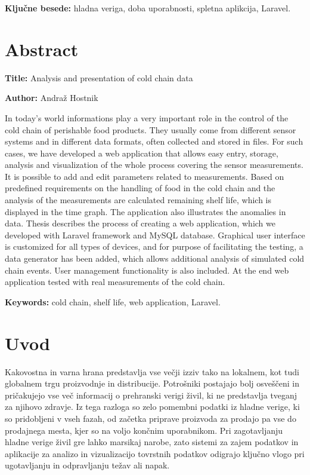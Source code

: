 \documentclass[a4paper, 12pt]{book}
\newcommand{\ttitleEn}{Analysis and presentation of cold chain data}
\newcommand{\tauthor}{Andraž Hostnik}
\newcommand{\tkeywords}{hladna veriga, doba uporabnosti, spletna aplikcija, Laravel}
\newcommand{\tkeywordsEn}{cold chain, shelf life, web application, Laravel}
\newcommand{\clearemptydoublepage}{\newpage{\pagestyle{empty}\cleardoublepage}}
\begin{document}
\noindent\textbf{Ključne besede:} \tkeywords.
\clearemptydoublepage

\chapter*{Abstract}

\noindent\textbf{Title:} \ttitleEn
\bigskip

\noindent\textbf{Author:} \tauthor
\bigskip

\noindent
In today's world informations play a very important role in the control of the cold chain of perishable food products. They usually come from different sensor systems and in different data formats, often collected and stored in files. For such cases, we have developed a web application that allows easy entry, storage, analysis and visualization of the whole process covering the sensor measurements. It is possible to add and edit parameters related to measurements. Based on predefined requirements on the handling of food in the cold chain and the analysis of the measurements are calculated remaining shelf life, which is displayed in the time graph. The application also illustrates the anomalies in data. Thesis describes the process of creating a web application, which we developed with Laravel framework and MySQL database. Graphical user interface is customized for all types of devices, and for purpose of facilitating the testing, a data generator has been added, which allows additional analysis of simulated cold chain events. User management functionality is also included. At the end web application tested with real measurements of the cold chain.
\bigskip

\noindent\textbf{Keywords:} \tkeywordsEn.
\clearemptydoublepage

\mainmatter
\setcounter{page}{1}
\pagestyle{fancy}

\chapter{Uvod}
Kakovostna in varna hrana predstavlja vse večji izziv tako na lokalnem, kot tudi globalnem trgu proizvodnje in distribucije. Potrošniki postajajo bolj osveščeni in pričakujejo vse več informacij o prehranski verigi živil, ki ne predstavlja tveganj za njihovo zdravje. Iz tega razloga so zelo pomembni podatki iz hladne verige, ki so pridobljeni v vseh fazah, od začetka priprave proizvoda za prodajo pa vse do prodajnega mesta, kjer so na voljo končnim uporabnikom. Pri zagotavljanju hladne verige živil gre lahko marsikaj narobe, zato sistemi za zajem podatkov in aplikacije za analizo in vizualizacijo tovrstnih podatkov odigrajo ključno vlogo pri ugotavljanju in odpravljanju težav ali napak.
\end{document}
